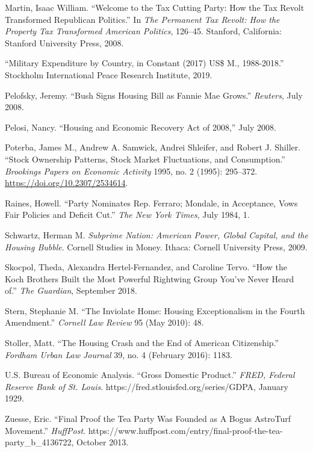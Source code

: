 \documentclass[
]{article}
\begin{document}
\leavevmode\hypertarget{ref-martin2008welcome}{}%
Martin, Isaac William. ``Welcome to the Tax Cutting Party: How the Tax Revolt Transformed Republican Politics.'' In \emph{The Permanent Tax Revolt: How the Property Tax Transformed American Politics}, 126--45. Stanford, California: Stanford University Press, 2008.

\leavevmode\hypertarget{ref-2019military}{}%
``Military Expenditure by Country, in Constant (2017) US\$ M., 1988-2018.'' Stockholm International Peace Research Institute, 2019.

\leavevmode\hypertarget{ref-pelofsky2008bush}{}%
Pelofsky, Jeremy. ``Bush Signs Housing Bill as Fannie Mae Grows.'' \emph{Reuters}, July 2008.

\leavevmode\hypertarget{ref-pelosi2008housing}{}%
Pelosi, Nancy. ``Housing and Economic Recovery Act of 2008,'' July 2008.

\leavevmode\hypertarget{ref-poterba1995stock}{}%
Poterba, James M., Andrew A. Samwick, Andrei Shleifer, and Robert J. Shiller. ``Stock Ownership Patterns, Stock Market Fluctuations, and Consumption.'' \emph{Brookings Papers on Economic Activity} 1995, no. 2 (1995): 295--372. \url{https://doi.org/10.2307/2534614}.

\leavevmode\hypertarget{ref-raines1984party}{}%
Raines, Howell. ``Party Nominates Rep. Ferraro; Mondale, in Acceptance, Vows Fair Policies and Deficit Cut.'' \emph{The New York Times}, July 1984, 1.

\leavevmode\hypertarget{ref-schwartz2009subprime}{}%
Schwartz, Herman M. \emph{Subprime Nation: American Power, Global Capital, and the Housing Bubble}. Cornell Studies in Money. Ithaca: Cornell University Press, 2009.

\leavevmode\hypertarget{ref-skocpol2018how}{}%
Skocpol, Theda, Alexandra Hertel-Fernandez, and Caroline Tervo. ``How the Koch Brothers Built the Most Powerful Rightwing Group You've Never Heard of.'' \emph{The Guardian}, September 2018.

\leavevmode\hypertarget{ref-stern2010inviolate}{}%
Stern, Stephanie M. ``The Inviolate Home: Housing Exceptionalism in the Fourth Amendment.'' \emph{Cornell Law Review} 95 (May 2010): 48.

\leavevmode\hypertarget{ref-stollerHousingCrashEnd2016}{}%
Stoller, Matt. ``The Housing Crash and the End of American Citizenship.'' \emph{Fordham Urban Law Journal} 39, no. 4 (February 2016): 1183.

\leavevmode\hypertarget{ref-usbureauofeconomicanalysis1929gross}{}%
U.S. Bureau of Economic Analysis. ``Gross Domestic Product.'' \emph{FRED, Federal Reserve Bank of St. Louis}. https://fred.stlouisfed.org/series/GDPA, January 1929.

\leavevmode\hypertarget{ref-zuesse2013final}{}%
Zuesse, Eric. ``Final Proof the Tea Party Was Founded as A Bogus AstroTurf Movement.'' \emph{HuffPost}. https://www.huffpost.com/entry/final-proof-the-tea-party\_b\_4136722, October 2013.
\end{document}
